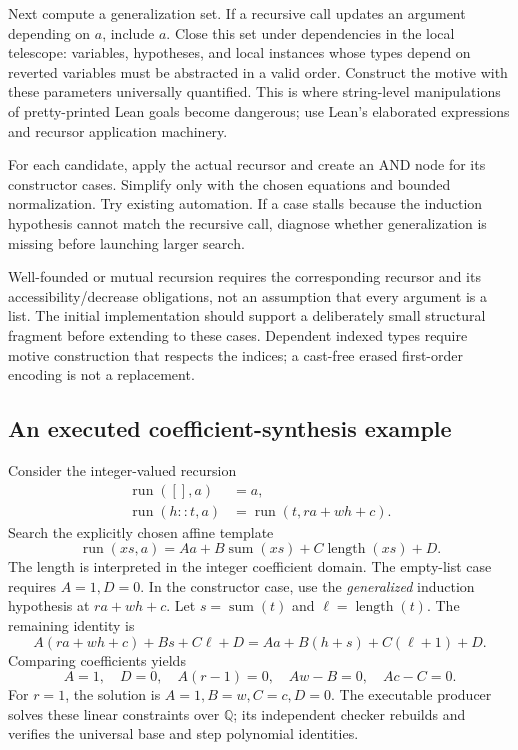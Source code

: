 \documentclass[11pt,a4paper]{article}
\newcommand{\Q}{\mathbb Q}\newcommand{\R}{\mathbb R}\newcommand{\N}{\mathbb N}
\begin{document}
Next compute a generalization set. If a recursive call updates an argument depending on $a$, include $a$. Close this set under dependencies in the local telescope: variables, hypotheses, and local instances whose types depend on reverted variables must be abstracted in a valid order. Construct the motive with these parameters universally quantified. This is where string-level manipulations of pretty-printed Lean goals become dangerous; use Lean's elaborated expressions and recursor application machinery.

For each candidate, apply the actual recursor and create an AND node for its constructor cases. Simplify only with the chosen equations and bounded normalization. Try existing automation. If a case stalls because the induction hypothesis cannot match the recursive call, diagnose whether generalization is missing before launching larger search.

Well-founded or mutual recursion requires the corresponding recursor and its accessibility/decrease obligations, not an assumption that every argument is a list. The initial implementation should support a deliberately small structural fragment before extending to these cases. Dependent indexed types require motive construction that respects the indices; a cast-free erased first-order encoding is not a replacement.

\subsection{An executed coefficient-synthesis example}
Consider the integer-valued recursion
\begin{align*}
 \operatorname{run}([],a)&=a,\\
 \operatorname{run}(h::t,a)&=\operatorname{run}(t,ra+wh+c).
\end{align*}
Search the explicitly chosen affine template
\begin{equation}\label{eq:invariant}
 \operatorname{run}(xs,a)
   =A a+B\operatorname{sum}(xs)+C\operatorname{length}(xs)+D.
\end{equation}
The length is interpreted in the integer coefficient domain. The empty-list case requires $A=1,D=0$. In the constructor case, use the \emph{generalized} induction hypothesis at $ra+wh+c$. Let $s=\operatorname{sum}(t)$ and $\ell=\operatorname{length}(t)$. The remaining identity is
\[
 A(ra+wh+c)+Bs+C\ell+D
 =Aa+B(h+s)+C(\ell+1)+D.
\]
Comparing coefficients yields
\begin{equation}\label{eq:constraints}
 A=1,\quad D=0,\quad A(r-1)=0,\quad Aw-B=0,\quad Ac-C=0.
\end{equation}
For $r=1$, the solution is $A=1,B=w,C=c,D=0$. The executable producer solves these linear constraints over $\Q$; its independent checker rebuilds and verifies the universal base and step polynomial identities.
\end{document}
